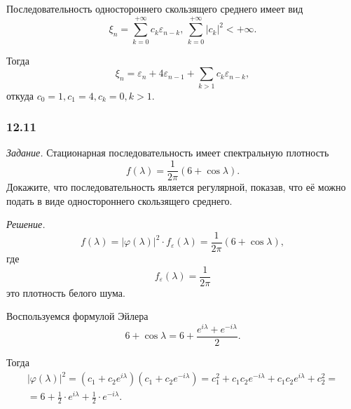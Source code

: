Последовательность одностороннего скользящего среднего имеет вид
\begin{equation*}
  \xi_n = \sum \limits_{k = 0}^{+\infty } c_k \varepsilon_{n - k}, \,
  \sum \limits_{k = 0}^{+\infty } \left| c_k \right|^2 < +\infty.
\end{equation*}

Тогда
\begin{equation*}
  \xi_n =
  \varepsilon_n + 4 \varepsilon_{n - 1} + \sum \limits_{k > 1} c_k \varepsilon_{n - k},
\end{equation*}
откуда $c_0 = 1, c_1 = 4, c_k = 0, k > 1$.

\subsubsection*{12.11}

\textit{Задание.}
Стационарная последовательность имеет спектральную плотность
\begin{equation*}
  f \left( \lambda \right) =
  \frac{1}{2 \pi } \left( 6 + \cos \lambda \right).
\end{equation*}
Докажите, что последовательность является регулярной, показав,
что её можно подать в виде одностороннего скользящего среднего.

\textit{Решение.}
\begin{equation*}
  f \left( \lambda \right) =
  \left| \varphi \left( \lambda \right) \right|^2 \cdot f_{ \varepsilon } \left( \lambda \right) =
  \frac{1}{2 \pi } \left( 6 + \cos \lambda \right),
\end{equation*}
где
\begin{equation*}
  f_{ \varepsilon } \left( \lambda \right) =
  \frac{1}{2 \pi }
\end{equation*}
это плотность белого шума.

Воспользуемся формулой Эйлера
\begin{equation*}
  6 + \cos \lambda =
  6 + \frac{e^{i \lambda } + e^{-i \lambda }}{2}.
\end{equation*}

Тогда
\begin{gather*}
  \left| \varphi \left( \lambda \right) \right|^2 =
  \left( c_1 + c_2 e^{i \lambda} \right) \left( c_1 + c_2 e^{-i \lambda } \right) =
  c_1^2 + c_1 c_2 e^{-i \lambda } + c_1 c_2 e^{i \lambda } + c_2^2 = \\
  = 6 + \frac{1}{2} \cdot e^{i \lambda } + \frac{1}{2} \cdot e^{-i \lambda }.
\end{gather*}

